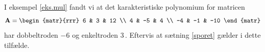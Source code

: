 \begin{exercise}
I eksempel \ref{eks.mul} fandt vi at det karakteristiske polynomium for matricen
\begin{equation*}
\mA = \begin{matr}{rrr} 6 & 3 & 12 \\ 4 & -5 & 4 \\ -4 & -1 & -10 \end{matr}
\end{equation*}
har dobbeltroden $-6$ og enkeltroden $3\,.$ Eftervis at sætning \ref{sporet} gælder i dette tilfælde.
\end{exercise}

 



